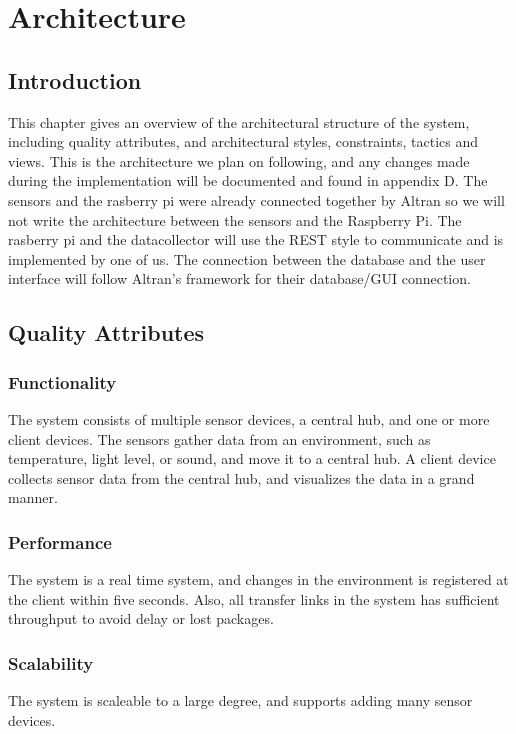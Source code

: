\documentclass[../document.tex]{subfiles}
\begin{document}
\section{Architecture}
\label{architecture}
\subsection{Introduction}
This chapter gives an overview of the architectural structure of the system, including quality attributes, and architectural styles, constraints, tactics and views. This is the architecture we plan on following, and any changes made during the implementation will be documented and found in appendix D. The sensors and the rasberry pi were already connected together by Altran so we will not write the architecture between the sensors and the Raspberry Pi. The rasberry pi and the datacollector will use the REST style to communicate and is implemented by one of us. The connection between the database and the user interface will follow Altran's framework for their database/GUI connection.

\subsection{Quality Attributes}
\subsubsection{Functionality}
The system consists of multiple sensor devices, a central hub, and one or more client devices. The sensors gather data from an environment, such as temperature, light level, or sound, and move it to a central hub. A client device collects sensor data from the central hub, and visualizes the data in a grand manner.

\subsubsection{Performance}
The system is a real time system, and changes in the environment is registered at the client within five seconds. Also, all transfer links in the system has sufficient throughput to avoid delay or lost packages.

\subsubsection{Scalability}
The system is scaleable to a large degree, and supports adding many sensor devices.
\end{document}

